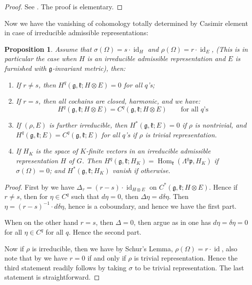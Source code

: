 \documentclass[11pt]{report}
\theoremstyle{definition}
\theoremstyle{plain}
\newtheorem{Prop}[Def]{Proposition}
\DeclareMathOperator{\id}{id}
\DeclareMathOperator{\Hom}{Hom}
\newcommand{\Lie}[1]{\mathfrak{#1}}
\begin{document}
\begin{proof}
	See \cite[Chapter~II, Theorem~2.5]{borel2013}. The proof is elementary.
\end{proof}
Now we have the vanishing of cohomology totally determined by Casimir element in case of irreducible admissible representations:
\begin{Prop}\label{olbrich3.1}
	Assume that $\sigma(\Omega)=s\cdot\id_H$ and $\rho(\Omega)=r\cdot \id_E$, (This is in particular the case when $H$ is an irreducible admissible representation and $E$ is furnished with $\Lie{g}$-invariant metric), then:
	\begin{enumerate}
		\item If $r\neq s$, then $H^q(\Lie{g}, \Lie{k}; H\otimes E)=0$ for all $q$'s;
		\item If $r=s$, then all cochains are closed, harmonic, and we have:
		\begin{equation*}
		H^q(\Lie{g}, \Lie{k};H\otimes E)=C^q(\Lie{g}, \Lie{k}; H\otimes E) \qquad \text{for all $q$'s}
		\end{equation*}
		\item If $(\rho,E)$ is further irreducible, then $H^*(\Lie{g}, \Lie{k};E)=0$ if $\rho$ is nontrivial, and $H^q(\Lie{g}, \Lie{k};E)=C^q(\Lie{g,k};E)$ for all $q$'s if $\rho$ is trivial representation.
		\item If $H_K$ is the space of $K$-finite vectors in an irreducible admissible representation $H$ of $G$. Then $H^q(\Lie{g,k};H_K)=\Hom_{\Lie{k}}(\Lambda^q\Lie{p},H_K)$ if $\sigma(\Omega)=0$; and $H^*(\Lie{g,k};H_K)$ vanish if otherwise.
	\end{enumerate}
\end{Prop}
\begin{proof}
First by  we have $\Delta_\tau=(r-s)\cdot \id_{H\otimes E}$ on $C^*(\Lie{g}, \Lie{k};H\otimes E)$. Hence if $r\neq s$, then for $\eta\in C^q$ such that $d\eta=0$, then $\Delta \eta=d\delta \eta$. Then $\eta=(r-s)^{-1}\cdot d\delta \eta$, hence is a coboundary, and hence we have the first part.
\par When on the other hand $r=s$, then $\Delta=0$, then argue as in  one has $d\eta=\delta\eta=0$ for all $\eta\in C^q$ for all $q$. Hence the second part.
\par Now if $\rho$ is irreducible, then we have by Schur's Lemma, $\rho(\Omega)=r\cdot \id$, also note that by \cite[Proposition~5.28(c)]{knapp2013} we have $r=0$ if and only if $\rho$ is trivial representation. Hence the third statement readily follows by taking $\sigma$ to be trivial representation. The last statement is straightforward.
\end{proof}
\end{document}
